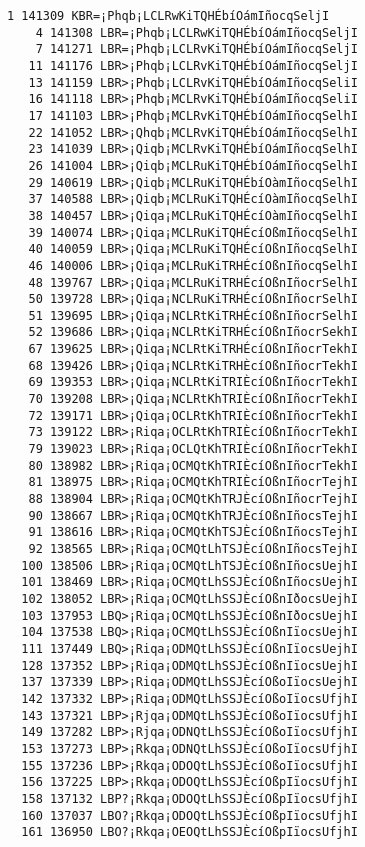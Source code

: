 \documentclass[11pt]{article}
\begin{document}
    \begin{Verbatim}[commandchars=\\\{\}]
    1 141309 KBR=¡Phqb¡LCLRwKiTQHÉbíOámIñocqSeljI
    4 141308 LBR=¡Phqb¡LCLRwKiTQHÉbíOámIñocqSeljI
    7 141271 LBR=¡Phqb¡LCLRvKiTQHÉbíOámIñocqSeljI
   11 141176 LBR>¡Phqb¡LCLRvKiTQHÉbíOámIñocqSeljI
   13 141159 LBR>¡Phqb¡LCLRvKiTQHÉbíOámIñocqSeliI
   16 141118 LBR>¡Phqb¡MCLRvKiTQHÉbíOámIñocqSeliI
   17 141103 LBR>¡Phqb¡MCLRvKiTQHÉbíOámIñocqSelhI
   22 141052 LBR>¡Qhqb¡MCLRvKiTQHÉbíOámIñocqSelhI
   23 141039 LBR>¡Qiqb¡MCLRvKiTQHÉbíOámIñocqSelhI
   26 141004 LBR>¡Qiqb¡MCLRuKiTQHÉbíOámIñocqSelhI
   29 140619 LBR>¡Qiqb¡MCLRuKiTQHÉbíOàmIñocqSelhI
   37 140588 LBR>¡Qiqb¡MCLRuKiTQHÉcíOàmIñocqSelhI
   38 140457 LBR>¡Qiqa¡MCLRuKiTQHÉcíOàmIñocqSelhI
   39 140074 LBR>¡Qiqa¡MCLRuKiTQHÉcíOßmIñocqSelhI
   40 140059 LBR>¡Qiqa¡MCLRuKiTQHÉcíOßnIñocqSelhI
   46 140006 LBR>¡Qiqa¡MCLRuKiTRHÉcíOßnIñocqSelhI
   48 139767 LBR>¡Qiqa¡MCLRuKiTRHÉcíOßnIñocrSelhI
   50 139728 LBR>¡Qiqa¡NCLRuKiTRHÉcíOßnIñocrSelhI
   51 139695 LBR>¡Qiqa¡NCLRtKiTRHÉcíOßnIñocrSelhI
   52 139686 LBR>¡Qiqa¡NCLRtKiTRHÉcíOßnIñocrSekhI
   67 139625 LBR>¡Qiqa¡NCLRtKiTRHÉcíOßnIñocrTekhI
   68 139426 LBR>¡Qiqa¡NCLRtKiTRHÈcíOßnIñocrTekhI
   69 139353 LBR>¡Qiqa¡NCLRtKiTRIÈcíOßnIñocrTekhI
   70 139208 LBR>¡Qiqa¡NCLRtKhTRIÈcíOßnIñocrTekhI
   72 139171 LBR>¡Qiqa¡OCLRtKhTRIÈcíOßnIñocrTekhI
   73 139122 LBR>¡Riqa¡OCLRtKhTRIÈcíOßnIñocrTekhI
   79 139023 LBR>¡Riqa¡OCLQtKhTRIÈcíOßnIñocrTekhI
   80 138982 LBR>¡Riqa¡OCMQtKhTRIÈcíOßnIñocrTekhI
   81 138975 LBR>¡Riqa¡OCMQtKhTRIÈcíOßnIñocrTejhI
   88 138904 LBR>¡Riqa¡OCMQtKhTRJÈcíOßnIñocrTejhI
   90 138667 LBR>¡Riqa¡OCMQtKhTRJÈcíOßnIñocsTejhI
   91 138616 LBR>¡Riqa¡OCMQtKhTSJÈcíOßnIñocsTejhI
   92 138565 LBR>¡Riqa¡OCMQtLhTSJÈcíOßnIñocsTejhI
  100 138506 LBR>¡Riqa¡OCMQtLhTSJÈcíOßnIñocsUejhI
  101 138469 LBR>¡Riqa¡OCMQtLhSSJÈcíOßnIñocsUejhI
  102 138052 LBR>¡Riqa¡OCMQtLhSSJÈcíOßnIðocsUejhI
  103 137953 LBQ>¡Riqa¡OCMQtLhSSJÈcíOßnIðocsUejhI
  104 137538 LBQ>¡Riqa¡OCMQtLhSSJÈcíOßnIïocsUejhI
  111 137449 LBQ>¡Riqa¡ODMQtLhSSJÈcíOßnIïocsUejhI
  128 137352 LBP>¡Riqa¡ODMQtLhSSJÈcíOßnIïocsUejhI
  137 137339 LBP>¡Riqa¡ODMQtLhSSJÈcíOßoIïocsUejhI
  142 137332 LBP>¡Riqa¡ODMQtLhSSJÈcíOßoIïocsUfjhI
  143 137321 LBP>¡Rjqa¡ODMQtLhSSJÈcíOßoIïocsUfjhI
  149 137282 LBP>¡Rjqa¡ODNQtLhSSJÈcíOßoIïocsUfjhI
  153 137273 LBP>¡Rkqa¡ODNQtLhSSJÈcíOßoIïocsUfjhI
  155 137236 LBP>¡Rkqa¡ODOQtLhSSJÈcíOßoIïocsUfjhI
  156 137225 LBP>¡Rkqa¡ODOQtLhSSJÈcíOßpIïocsUfjhI
  158 137132 LBP?¡Rkqa¡ODOQtLhSSJÈcíOßpIïocsUfjhI
  160 137037 LBO?¡Rkqa¡ODOQtLhSSJÈcíOßpIïocsUfjhI
  161 136950 LBO?¡Rkqa¡OEOQtLhSSJÈcíOßpIïocsUfjhI

\end{Verbatim}
\end{document}

